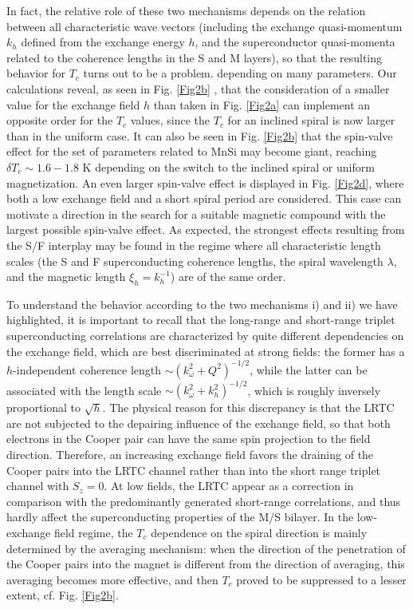 \documentclass[prb,amsmath,amssymb,reprint]{revtex4-2}
\begin{document}
In fact, the relative role of these two mechanisms depends on the relation between all characteristic wave vectors (including the exchange quasi-momentum $k_h$ defined from the exchange energy $h$, and the superconductor quasi-momenta related to the coherence lengths in the S and M layers), so that the resulting behavior for $T_c$ turns out to be a problem. depending on many parameters.  Our calculations reveal, as seen in Fig. \ref{Fig2b} , that the consideration of a smaller value for the exchange field $h$ than taken in Fig. \ref{Fig2a} can implement an opposite
order for the $T_c$ values, since the  $T_c$ for an inclined spiral is now larger than in the uniform case.
It can also be seen in Fig. \ref{Fig2b} that the spin-valve effect  for the set of parameters related to MnSi \cite{Bauer} may become giant,  reaching $\delta T_c \sim 1.6-1.8$ K depending on the switch to the inclined spiral or uniform magnetization.
An even larger spin-valve effect is displayed in Fig. \ref{Fig2d}, where both a low exchange field and a short spiral period are considered. This case can motivate a direction in the search for a suitable magnetic compound with the largest possible spin-valve effect. As expected, the strongest effects resulting from the S/F interplay may be found in the regime where all characteristic length scales (the S and F superconducting coherence lengths, the spiral wavelength $\lambda$, and the magnetic length $\xi_h=k_h^{-1}$) are of the same order.

To understand the behavior according to the two mechanisms i) and ii) we have highlighted, it is important to recall that the long-range and short-range triplet superconducting correlations are characterized by quite different dependencies on the exchange field, which are best discriminated at strong fields: the former has a $h$-independent coherence length $\sim (k_\omega^2+Q^2)^{-1/2}$, while the latter can be associated with the length scale $\sim (k_\omega^2+k_h^2)^{-1/2}$, which is roughly inversely proportional to $\sqrt{h}$.
The physical reason for this discrepancy is that the LRTC are not subjected to the depairing influence of the exchange field, so that both electrons in the Cooper pair can have the same spin projection to the field direction. Therefore, an increasing exchange field favors the draining of the Cooper pairs into the LRTC channel rather than into the short range triplet channel with $S_z=0$. At low fields, the LRTC appear as a correction in comparison with the predominantly generated short-range correlations, and thus hardly affect the superconducting properties of the M/S bilayer.
In the low-exchange field regime, the $T_c$ dependence on the spiral direction is mainly determined by the averaging mechanism:
when the direction of the penetration of the Cooper pairs into the magnet is different from  the direction of averaging, this averaging becomes more effective, and then $T_c$ proved to be suppressed to a lesser extent, cf. Fig. \ref{Fig2b}.
\end{document}
